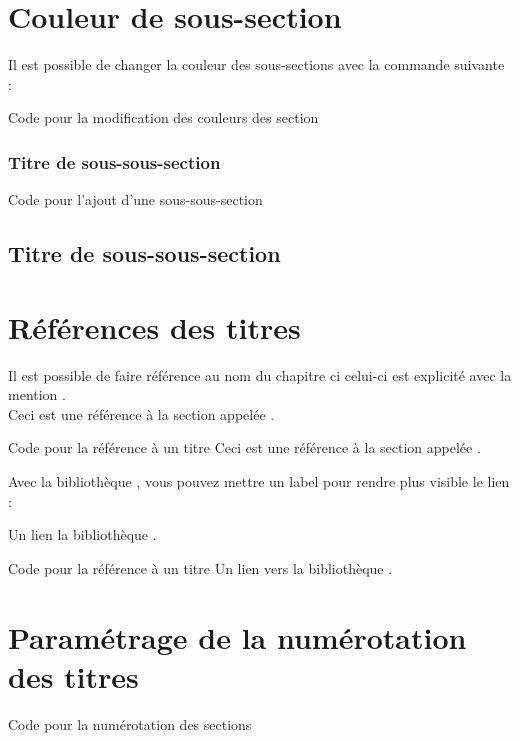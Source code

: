 \section{Couleur de sous-section}

Il est possible de changer la couleur des sous-sections avec la commande suivante : \\

\begin{Latex}{Code pour la modification des couleurs des section}
\end{Latex}


\subsubsection{Titre de sous-sous-section}
\begin{Latex}{Code pour l'ajout d'une sous-sous-section}
\subsection{Titre de sous-sous-section}
\end{Latex}


\section{Références des titres}

Il est possible de faire référence au nom du chapitre ci celui-ci est explicité avec la mention .\\

Ceci est une référence à la section appelée .\\

\begin{Latex}{Code pour la référence à un titre}
Ceci est une référence à la section appelée .
\end{Latex}

Avec la bibliothèque , vous pouvez mettre un label pour rendre plus visible le lien : 

Un lien la bibliothèque .

\begin{Latex}{Code pour la référence à un titre}
Un lien vers la bibliothèque .
\end{Latex}

\section{Paramétrage de la numérotation des titres}

\begin{Latex}{Code pour la numérotation des sections}
\enableSectionPrefix
\end{Latex}

